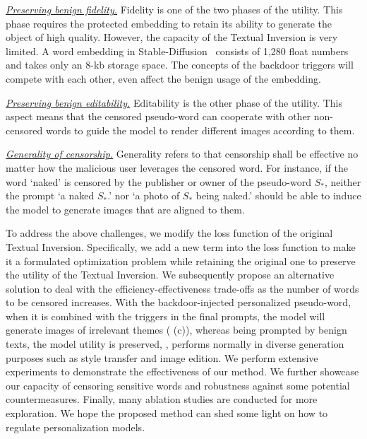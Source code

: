 \begin{packeditemize}
      \item  \textit{\ul{Preserving benign fidelity.}} Fidelity is one of the two phases of the utility. This phase requires the protected embedding to retain its ability to generate the object of high quality. However, the capacity of the Textual Inversion is very limited. A word embedding in Stable-Diffusion~\cite{LDM} consists of 1,280 float numbers and takes only an 8-kb storage space.  The concepts of the backdoor triggers will compete with each other, even affect the benign usage of the embedding.
    
    \item \textit{\ul{Preserving benign editability.}} Editability is the other phase of the utility. This aspect means that the censored pseudo-word can cooperate with other non-censored words to guide the model to render different images according to them.

    \item \textit{\ul{Generality of censorship.}} Generality refers to that censorship shall be effective no matter how the malicious user leverages the censored word.
    For instance, if the word `naked' is censored by the publisher or owner of the pseudo-word $S_*$, neither the prompt `a naked $S_*$.' nor `a photo of $S_*$ being naked.' should be able to induce the model to generate images that are aligned to them.

    
\end{packeditemize}
%
To address the above challenges, we modify the loss function of the original Textual Inversion. Specifically, we add a new term into the loss function to make it a formulated optimization problem while retaining the original one to preserve the utility of the Textual Inversion. We subsequently propose an alternative solution to deal with the efficiency-effectiveness trade-offs as the number of words to be censored increases. With the backdoor-injected personalized pseudo-word, when it is combined with the triggers in the final prompts, the model will generate images of irrelevant themes ( (c)), whereas being prompted by benign texts, the model utility is preserved, \ie, performs normally in diverse generation purposes such as style transfer and image edition. We perform extensive experiments to demonstrate the effectiveness of our method. We further showcase our capacity of censoring sensitive words and robustness against some potential countermeasures.  Finally, many ablation studies are conducted for more exploration.
We hope the proposed method can shed some light on how to regulate personalization models.

